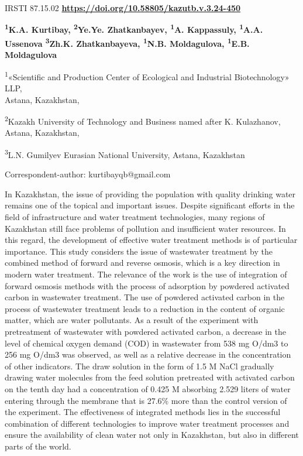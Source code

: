\newpage
IRSTI 87.15.02
\hfill {\bfseries \href{https://doi.org/10.58805/kazutb.v.3.24-450}{https://doi.org/10.58805/kazutb.v.3.24-450}}


\begin{center}
{\bfseries \textsuperscript{1}K.A. Kurtibay\envelope, \textsuperscript{2}Ye.Ye. Zhatkanbayev, \textsuperscript{1}A. Kappassuly, \textsuperscript{1}A.A. Ussenova \textsuperscript{3}Zh.K. Zhatkanbayeva, \textsuperscript{1}N.B. Moldagulova, \textsuperscript{1}E.B. Moldagulova}

\textsuperscript{1}«Scientific and Production Center of Ecological and
Industrial Biotechnology» LLP,\\
Astana, Kazakhstan,

\textsuperscript{2}Kazakh University of Technology and Business named
after K. Kulazhanov,\\
Astana, Kazakhstan,

\textsuperscript{3}L.N. Gumilyev Eurasian National University, Astana,
Kazakhstan
\end{center}
\envelope Correspondent-author: kurtibayqb@gmail.com


In Kazakhstan, the issue of providing the population with quality
drinking water remains one of the topical and important issues. Despite
significant efforts in the field of infrastructure and water treatment
technologies, many regions of Kazakhstan still face problems of
pollution and insufficient water resources. In this regard, the
development of effective water treatment methods is of particular
importance. This study considers the issue of wastewater treatment by
the combined method of forward and reverse osmosis, which is a key
direction in modern water treatment. The relevance of the work is the
use of integration of forward osmosis methods with the process of
adsorption by powdered activated carbon in wastewater treatment. The use
of powdered activated carbon in the process of wastewater treatment
leads to a reduction in the content of organic matter, which are water
pollutants. As a result of the experiment with pretreatment of
wastewater with powdered activated carbon, a decrease in the level of
chemical oxygen demand (COD) in wastewater from 538 mg O/dm3 to 256 mg
O/dm3 was observed, as well as a relative decrease in the concentration
of other indicators. The draw solution in the form of 1.5 M NaCl
gradually drawing water molecules from the feed solution pretreated with
activated carbon on the tenth day had a concentration of 0.425 M
absorbing 2.529 liters of water entering through the membrane that is
27.6\% more than the control version of the experiment. The
effectiveness of integrated methods lies in the successful combination
of different technologies to improve water treatment processes and
ensure the availability of clean water not only in Kazakhstan, but also
in different parts of the world.

